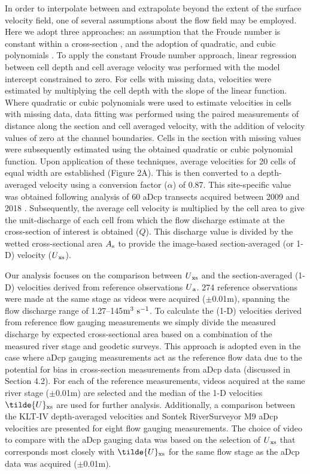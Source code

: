 \documentclass[hess, manuscript]{copernicus} %
\begin{document}
In order to interpolate between and extrapolate beyond the extent of the surface velocity field, one of several assumptions about the flow field may be employed. Here we adopt three approaches: an assumption that the Froude number is constant within a cross-section \citep{LeCoz2010, Fulford1986}, and the adoption of quadratic, and cubic polynomials \citep{Leitao2018}. To apply the constant Froude number approach, linear regression between cell depth and cell average velocity was performed with the model intercept constrained to zero. For cells with missing data, velocities were estimated by multiplying the cell depth with the slope of the linear function. Where quadratic or cubic polynomials were used to estimate velocities in cells with missing data, data fitting was performed using the paired measurements of distance along the section and cell averaged velocity, with the addition of velocity values of zero at the channel boundaries. Cells in the section with missing values were subsequently estimated using the obtained quadratic or cubic polynomial function. Upon application of these techniques, average velocities for 20 cells of equal width are established (Figure 2A). This is then converted to a depth-averaged velocity using a conversion factor ($\alpha$) of 0.87. This site-specific value was obtained following analysis of 60 aDcp transects acquired between 2009 and 2018 \citep{alpha_analysis}. Subsequently, the average cell velocity is multiplied by the cell area to give the unit-discharge of each cell from which the flow discharge estimate at the cross-section of interest is obtained (${Q}$). This discharge value is divided by the wetted cross-sectional area {$A\textsubscript{s}$} to provide the image-based section-averaged (or 1-D) velocity (${U}\textsubscript{xs}$).

Our analysis focuses on the comparison between ${U}\textsubscript{xs}$ and the section-averaged (1-D) velocities derived from reference observations $U\textsubscript{a}$. 274 reference observations were made at the same stage as videos were acquired ($\pm$0.01m), spanning the flow discharge range of 1.27--145$\textnormal{m\textsuperscript{3} s\textsuperscript{-1}}$. To calculate the (1-D) velocities derived from reference flow gauging measurements we simply divide the measured discharge by expected cross-sectional area based on a combination of the measured river stage and geodetic surveys. This approach is adopted even in the case where aDcp gauging measurements act as the reference flow data due to the potential for bias in cross-section measurements from aDcp data (discussed in Section 4.2). For each of the reference measurements, videos acquired at the same river stage ($\pm$0.01m) are selected and the median of the 1-D velocities $\tilde{U}\textsubscript{xs}$ are used for further analysis. Additionally, a comparison between the KLT-IV depth-averaged velocities and Sontek RiverSurveyor M9 aDcp velocities are presented for eight flow gauging measurements. The choice of video to compare with the aDcp gauging data was based on the selection of ${U}\textsubscript{xs}$ that corresponds most closely with $\tilde{U}\textsubscript{xs}$ for the same flow stage as the aDcp data was acquired ($\pm$0.01m).
\end{document}
